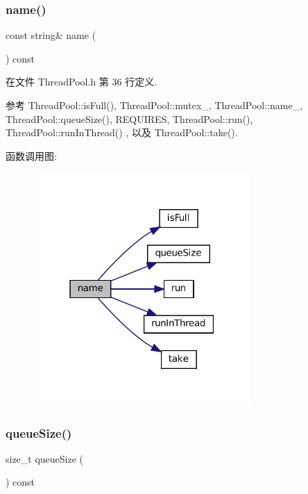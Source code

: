 \subsubsection{\texorpdfstring{name()}{name()}}
{\footnotesize\ttfamily const string\& name (\begin{DoxyParamCaption}{ }\end{DoxyParamCaption}) const\hspace{0.3cm}{\ttfamily [inline]}}



在文件 Thread\+Pool.\+h 第 36 行定义.



参考 Thread\+Pool\+::is\+Full(), Thread\+Pool\+::mutex\+\_\+, Thread\+Pool\+::name\+\_\+, Thread\+Pool\+::queue\+Size(), R\+E\+Q\+U\+I\+R\+ES, Thread\+Pool\+::run(), Thread\+Pool\+::run\+In\+Thread() , 以及 Thread\+Pool\+::take().

函数调用图\+:
\nopagebreak
\begin{figure}[H]
\begin{center}
\leavevmode
\includegraphics[width=235pt]{classmuduo_1_1ThreadPool_a47f4f0a66d5a539e687100dc65462ced_cgraph}
\end{center}
\end{figure}
\mbox{\label{classmuduo_1_1ThreadPool_a0eff42734d64323acbd2e676bcd27b76}} 
\subsubsection{\texorpdfstring{queue\+Size()}{queueSize()}}
{\footnotesize\ttfamily size\+\_\+t queue\+Size (\begin{DoxyParamCaption}{ }\end{DoxyParamCaption}) const}



